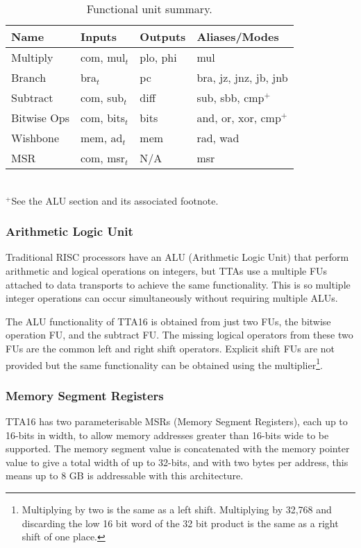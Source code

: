 \begin{table}[h!]
\begin{center}
\begin{tabular}{l | l | l | l}
Name			& Inputs		& Outputs	& Aliases/Modes	\\
\hline
Multiply		& com, mul$_t$	& plo, phi	& mul	\\
Branch			& bra$_t$		& pc		& bra, jz, jnz, jb, jnb	\\
Subtract		& com, sub$_t$	& diff		& sub, sbb, cmp$^+$	\\
Bitwise Ops		& com, bits$_t$	& bits		& and, or, xor, cmp$^+$	\\
Wishbone		& mem, ad$_t$	& mem		& rad, wad	\\
MSR				& com, msr$_t$	& N/A		& msr	\\
\end{tabular}	\\
\footnotesize
$^+$See the ALU section and its associated footnote.
\normalsize
\end{center}
\caption[Functional unit summary]{Functional unit summary.}
\label{TTAPROG_FU_Regs}
\end{table}


\subsubsection{Arithmetic Logic Unit}
Traditional RISC processors have an ALU (Arithmetic Logic Unit) that perform
arithmetic and logical operations on integers, but TTAs use a multiple FUs
attached to data transports to achieve the same functionality. This is so
multiple integer operations can occur simultaneously without requiring multiple
ALUs.

The ALU functionality of TTA16 is obtained from just two FUs, the bitwise
operation FU, and the subtract FU. The missing logical operators from these two
FUs are the common left and right shift operators. Explicit shift FUs are not
provided but the same functionality can be obtained using the
multiplier\footnote{Multiplying by two is the same as a left shift. Multiplying
by 32,768 and discarding the low 16 bit word of the 32 bit product is the same
as a right shift of one place.}.


\subsubsection{Memory Segment Registers}
\label{TTAPROG_MSR}
TTA16 has two parameterisable MSRs (Memory Segment Registers), each up to
16-bits in width, to allow memory addresses greater than 16-bits wide to be
supported. The memory segment value is concatenated with the memory pointer
value to give a total width of up to 32-bits, and with two bytes per address,
this means up to 8 GB is addressable with this architecture.

